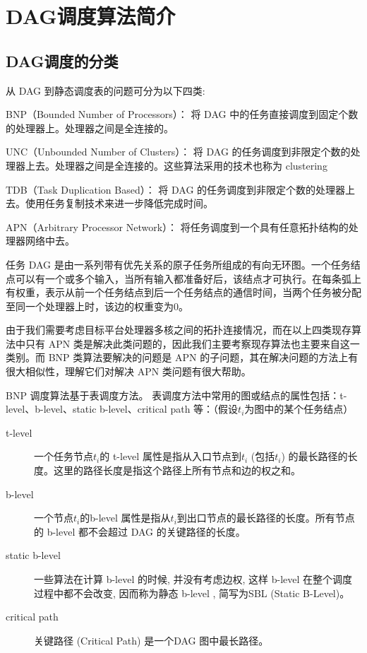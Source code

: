 
\section{DAG调度算法简介}
\label{basic-DAG-sch}

\subsection{DAG调度的分类}

从 DAG 到静态调度表的问题可分为以下四类:

BNP（Bounded Number of Processors）：
    将 DAG 中的任务直接调度到固定个数的处理器上。处理器之间是全连接的。

UNC（Unbounded Number of Clusters）：
    将 DAG 的任务调度到非限定个数的处理器上去。处理器之间是全连接的。这些算法采用的技术也称为 clustering

TDB（Task Duplication Based）：
    将 DAG 的任务调度到非限定个数的处理器上去。使用任务复制技术来进一步降低完成时间。

APN（Arbitrary Processor Network）：
    将任务调度到一个具有任意拓扑结构的处理器网络中去。

任务 DAG 是由一系列带有优先关系的原子任务所组成的有向无环图。一个任务结点可以有一个或多个输入，当所有输入都准备好后，该结点才可执行。在每条弧上有权重，表示从前一个任务结点到后一个任务结点的通信时间，当两个任务被分配至同一个处理器上时，该边的权重变为0。



由于我们需要考虑目标平台处理器多核之间的拓扑连接情况，而在以上四类现存算法中只有 APN 类是解决此类问题的，因此我们主要考察现存算法也主要来自这一类别。而 BNP 类算法要解决的问题是 APN 的子问题，其在解决问题的方法上有很大相似性，理解它们对解决 APN 类问题有很大帮助。

BNP 调度算法基于表调度方法。%
表调度方法中常用的图或结点的属性包括：t-level、b-level、static b-level、critical path 等：（假设$t_i$为图中的某个任务结点）%
\begin{description}
  \item[t-level] 一个任务节点$t_i$的 t-level 属性是指从入口节点到$t_i$ (包括$t_i$) 的最长路径的长度。这里的路径长度是指这个路径上所有节点和边的权之和。
  \item[b-level] 一个节点$t_i$的b-level 属性是指从$t_i$到出口节点的最长路径的长度。所有节点的 b-level 都不会超过 DAG 的关键路径的长度。
  \item[static b-level] 一些算法在计算 b-level 的时候, 并没有考虑边权, 这样 b-level 在整个调度过程中都不会改变, 因而称为静态 b-level , 简写为SBL (Static B-Level)。
  \item[critical path] 关键路径 (Critical Path) 是一个DAG 图中最长路径。
\end{description}

